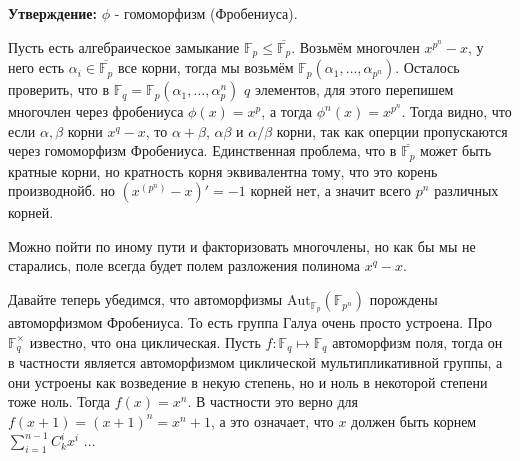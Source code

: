 \documentclass[a4paper, 12pt]{book}
\begin{document}
\textbf{Утверждение:} $\phi$ - гомоморфизм (Фробениуса).

Пусть есть алгебраическое замыкание $\mathbb{F}_p\le\overline{\mathbb{F}_p}$.
Возьмём многочлен $x^{p^n}-x$, у него есть $\alpha_i\in\overline{\mathbb{F}_p}$
все корни, тогда мы возьмём $\mathbb{F}_p(\alpha_1,\ldots,\alpha_{p^n})$.
Осталось проверить, что в $\mathbb{F}_q=\mathbb{F}_p(\alpha_1,\ldots,\alpha_p^n)$
$q$ элементов, для этого перепишем многочлен через фробениуса $\phi(x)=x^p$, а
тогда $\phi^n(x)=x^{p^n}$. Тогда видно, что если $\alpha,\beta$ корни $x^q-x$,
то $\alpha+\beta$, $\alpha\beta$ и $\alpha/\beta$ корни, так как оперции
пропускаются через гомоморфизм Фробениуса. Единственная проблема, что в
$\overline{\mathbb{F}_p}$ может быть кратные корни, но кратность корня
эквивалентна тому, что это корень производнойб. но $(x^(p^n)-x)'=-1$ корней нет,
а значит всего $p^n$ различных корней.

Можно пойти по иному пути и факторизовать многочлены, но как бы мы не старались,
поле всегда будет полем разложения полинома $x^q-x$.

Давайте теперь убедимся, что автоморфизмы $\text{Aut}_{\mathbb{F}_p}(
\mathbb{F}_{p^n})$ порождены автоморфизмом Фробениуса. То есть группа Галуа
очень просто устроена. Про $\mathbb{F}_q^\times$ известно, что она циклическая.
Пусть $f:\mathbb{F}_q\mapsto\mathbb{F}_q$ автоморфизм поля, тогда он в
частности является автоморфизмом циклической мультипликативной группы, а они
устроены как возведение в некую степень, но и ноль в некоторой степени тоже ноль.
Тогда $f(x)=x^n$. В частности это верно для $f(x+1)=(x+1)^n=x^n+1$, а это
означает, что $x$ должен быть корнем $\sum_{i=1}^{n-1}C_k^ix^i$ ...
\end{document}
